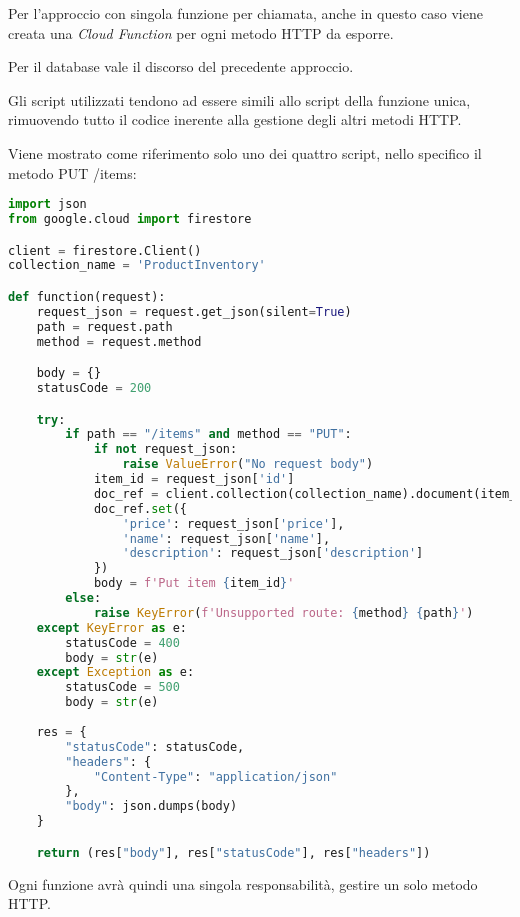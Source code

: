 Per l'approccio con singola funzione per chiamata, anche in questo caso viene creata una \textit{Cloud Function} per ogni metodo HTTP da esporre.

Per il database vale il discorso del precedente approccio.

Gli script utilizzati tendono ad essere simili allo script della funzione unica, rimuovendo tutto il codice inerente alla gestione degli altri metodi HTTP.

Viene mostrato come riferimento solo uno dei quattro script, nello specifico il metodo PUT /items:
\begin{lstlisting}[language=python]
import json
from google.cloud import firestore

client = firestore.Client()
collection_name = 'ProductInventory'

def function(request):
    request_json = request.get_json(silent=True)
    path = request.path
    method = request.method

    body = {}
    statusCode = 200

    try:
        if path == "/items" and method == "PUT":
            if not request_json:
                raise ValueError("No request body")
            item_id = request_json['id']
            doc_ref = client.collection(collection_name).document(item_id)
            doc_ref.set({
                'price': request_json['price'],
                'name': request_json['name'],
                'description': request_json['description']
            })
            body = f'Put item {item_id}'
        else:
            raise KeyError(f'Unsupported route: {method} {path}')
    except KeyError as e:
        statusCode = 400
        body = str(e)
    except Exception as e:
        statusCode = 500
        body = str(e)
    
    res = {
        "statusCode": statusCode,
        "headers": {
            "Content-Type": "application/json"
        },
        "body": json.dumps(body)
    }

    return (res["body"], res["statusCode"], res["headers"])
\end{lstlisting}
Ogni funzione avrà quindi una singola responsabilità, gestire un solo metodo HTTP.